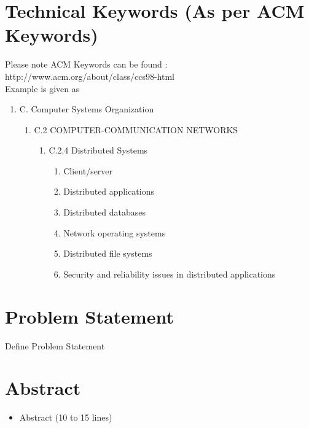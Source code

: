 \documentclass[oneside,a4paper,12pt]{report}
\begin{document}
\section{Technical Keywords (As per ACM Keywords)}
Please note ACM Keywords can be found : http://www.acm.org/about/class/ccs98-html \\
Example is given as
\begin{enumerate}
	\item C. Computer Systems Organization 
	\begin{enumerate}
		\item C.2 COMPUTER-COMMUNICATION NETWORKS 
		\begin{enumerate}
			\item C.2.4 Distributed Systems 
			\begin{enumerate}
				\item  Client/server 
\item Distributed applications
\item Distributed databases
\item Network operating systems 
\item Distributed file systems
\item Security and reliability issues in distributed applications
	 		\end{enumerate} 
		\end{enumerate} 
	  

	
	\end{enumerate}
\end{enumerate}



\section{Problem Statement}
\label{sec:problem}
        Define Problem Statement
\section{Abstract}
\begin{itemize}
	\item Abstract (10 to 15 lines)
\end{itemize}
\end{document}
